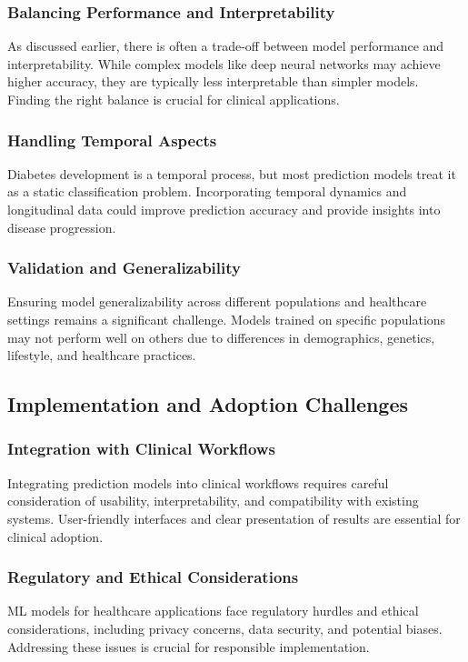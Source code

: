 \documentclass[journal]{IEEEtran}
\begin{document}
\subsubsection{Balancing Performance and Interpretability}
As discussed earlier, there is often a trade-off between model performance and interpretability. While complex models like deep neural networks may achieve higher accuracy, they are typically less interpretable than simpler models. Finding the right balance is crucial for clinical applications.

\subsubsection{Handling Temporal Aspects}
Diabetes development is a temporal process, but most prediction models treat it as a static classification problem. Incorporating temporal dynamics and longitudinal data could improve prediction accuracy and provide insights into disease progression.

\subsubsection{Validation and Generalizability}
Ensuring model generalizability across different populations and healthcare settings remains a significant challenge. Models trained on specific populations may not perform well on others due to differences in demographics, genetics, lifestyle, and healthcare practices.

\subsection{Implementation and Adoption Challenges}
\subsubsection{Integration with Clinical Workflows}
Integrating prediction models into clinical workflows requires careful consideration of usability, interpretability, and compatibility with existing systems. User-friendly interfaces and clear presentation of results are essential for clinical adoption.

\subsubsection{Regulatory and Ethical Considerations}
ML models for healthcare applications face regulatory hurdles and ethical considerations, including privacy concerns, data security, and potential biases. Addressing these issues is crucial for responsible implementation.
\end{document}
